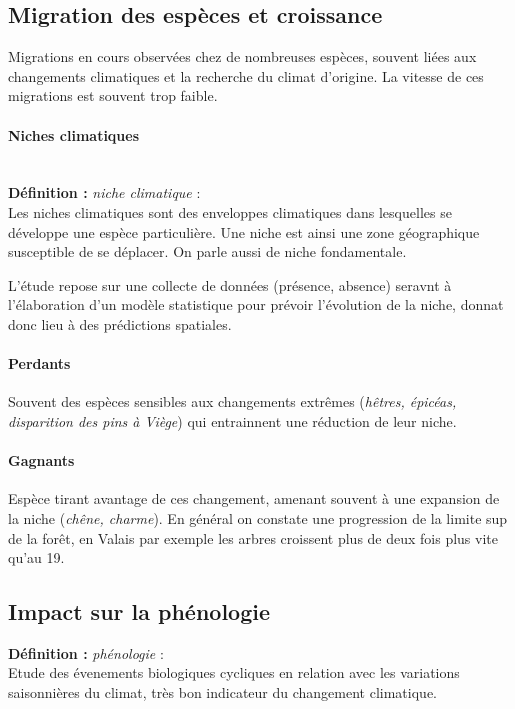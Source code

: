 \documentclass {article}
\begin{document}
\subsection{Migration des espèces et croissance}

Migrations en cours observées chez de nombreuses espèces, souvent liées aux changements climatiques et la recherche du climat d'origine. La vitesse de ces migrations est souvent trop faible.

\paragraph{Niches climatiques}
\\
\textbf{Définition :} \textit{niche climatique} : 
\\ Les niches climatiques sont des enveloppes climatiques dans lesquelles se développe une espèce particulière. Une niche est ainsi une zone géographique susceptible de se déplacer. On parle aussi de niche fondamentale.

L'étude repose sur une collecte de données (présence, absence) seravnt à l'élaboration d'un modèle statistique pour prévoir l'évolution de la niche, donnat donc lieu à des prédictions spatiales.

\paragraph{Perdants}
Souvent des espèces sensibles aux changements extrêmes (\emph{hêtres, épicéas, disparition des pins à Viège}) qui entrainnent une réduction de leur niche.
\paragraph{Gagnants}
Espèce tirant avantage de ces changement, amenant souvent à une expansion de la niche (\emph{chêne, charme}). En général on constate une progression de la limite sup de la forêt, en Valais par exemple les arbres croissent plus de deux fois plus vite qu'au 19.

\subsection{Impact sur la phénologie}

\textbf{Définition :} \textit{phénologie} :
\\ Etude des évenements biologiques cycliques en relation avec les variations saisonnières du climat, très bon indicateur du changement climatique.
\end{document}
